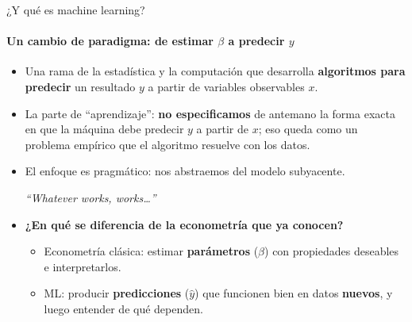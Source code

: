 \documentclass{beamer}
\newcommand{\1}{\mathbb{I}}
\begin{document}
\begin{frame}{¿Y qué es machine learning?}
\framesubtitle{Un cambio de paradigma: de estimar $\beta$ a predecir $y$}
\small
\begin{itemize}\itemsep5pt
  \item Una rama de la estadística y la computación que desarrolla \textbf{algoritmos para predecir} un resultado $y$ a partir de variables observables $x$. \pause
  \item La parte de ``aprendizaje'': \textbf{no especificamos} de antemano la forma exacta en que la máquina debe predecir $y$ a partir de $x$; eso queda como un problema empírico que el algoritmo resuelve con los datos. \pause
  \item El enfoque es pragmático: nos abstraemos del modelo subyacente.
  \begin{center}
  \emph{``Whatever works, works\ldots''}
  \end{center} \pause
  \item \textbf{¿En qué se diferencia de la econometría que ya conocen?}
  \begin{itemize}\itemsep3pt
    \item Econometría clásica: estimar \textbf{parámetros} ($\beta$) con propiedades deseables e interpretarlos.
    \item ML: producir \textbf{predicciones} ($\hat{y}$) que funcionen bien en datos \textbf{nuevos}, y luego entender de qué dependen.
  \end{itemize}
\end{itemize}
\end{frame}
\end{document}
